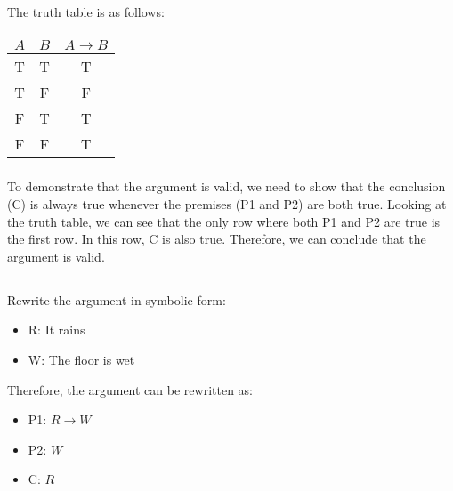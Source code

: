 \documentclass[UTF8,a4paper,AutoFakeBold,AutoFakeSlant]{article}
\begin{document}
\subsubsection{}
The truth table is as follows:
\begin{table}[H]
\centering
\begin{tabular}{|c|c|c|}
\hline
$A$ & $B$ & $A \rightarrow B$ \\ \hline
T   & T   & T                 \\ \hline
T   & F   & F                 \\ \hline
F   & T   & T                 \\ \hline
F   & F   & T                 \\ \hline
\end{tabular}
\end{table}

\subsubsection{}
To demonstrate that the argument is valid, we need to show that the conclusion (C) is always true whenever the premises (P1 and P2) are both true. 
Looking at the truth table, we can see that the only row where both P1 and P2 are true is the first row. In this row, C is also true. Therefore, we can conclude that the argument is valid.


\subsection{}

\subsubsection{}
Rewrite the argument in symbolic form:
\begin{itemize}
    \item R: It rains
    \item W: The floor is wet
\end{itemize}
Therefore, the argument can be rewritten as:
\begin{itemize}
    \item P1: $R \rightarrow W$
    \item P2: $W$
    \item C: $R$
\end{itemize}
\end{document}
